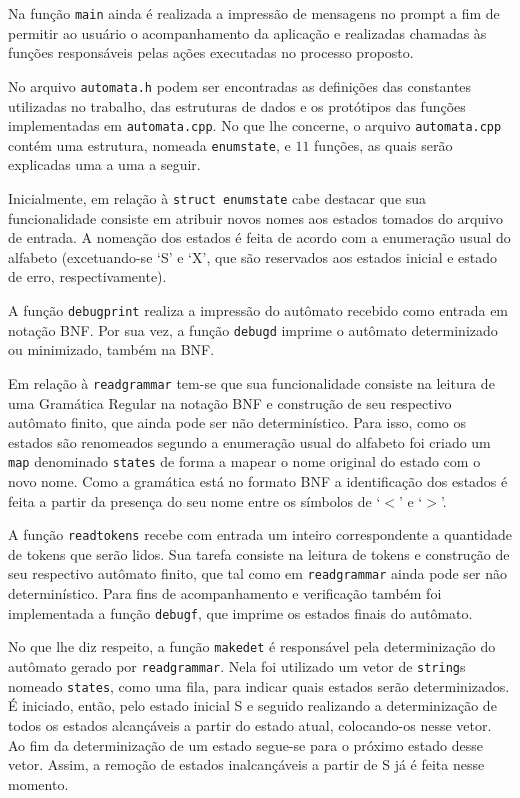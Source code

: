 \documentclass[12pt]{article}
\begin{document}
Na função \texttt{main} ainda é realizada a impressão de mensagens no prompt a fim de permitir ao usuário o acompanhamento da aplicação e realizadas chamadas às funções responsáveis pelas ações executadas no processo proposto.

No arquivo \texttt{automata.h} podem ser encontradas as definições das constantes utilizadas no trabalho, das estruturas de dados e os protótipos das funções implementadas em \texttt{automata.cpp}. No que lhe concerne, o arquivo \texttt{automata.cpp} contém uma estrutura, nomeada \texttt{enumstate}, e $11$ funções, as quais serão explicadas uma a uma a seguir.

Inicialmente, em relação à \texttt{struct enumstate} cabe destacar que sua funcionalidade consiste em atribuir novos nomes aos estados tomados do arquivo de entrada. A nomeação dos estados é feita de acordo com a enumeração usual do alfabeto (excetuando-se `S' e `X', que são reservados aos estados inicial e estado de erro, respectivamente).

A função \texttt{debugprint} realiza a impressão do autômato recebido como entrada em notação BNF. Por sua vez, a função \texttt{debugd} imprime o autômato determinizado ou minimizado, também na BNF.

Em relação à \texttt{readgrammar} tem-se que sua funcionalidade consiste na leitura de uma Gramática Regular na notação BNF e construção de seu respectivo autômato finito, que ainda pode ser não determinístico. Para isso, como os estados são renomeados segundo a enumeração usual do alfabeto foi criado um \texttt{map} denominado \texttt{states} de forma a mapear o nome original do estado com o novo nome. Como a gramática está no formato BNF a identificação dos estados é feita a partir da presença do seu nome entre os símbolos de `$<$' e `$>$'.

A função \texttt{readtokens} recebe com entrada um inteiro correspondente a quantidade de tokens que serão lidos. Sua tarefa consiste na leitura de tokens e construção de seu respectivo autômato finito, que tal como em \texttt{readgrammar} ainda pode ser não determinístico. Para fins de acompanhamento  e verificação também foi implementada a função \texttt{debugf}, que imprime os estados finais do autômato.

No que lhe diz respeito, a função \texttt{makedet} é responsável pela determinização do autômato gerado por \texttt{readgrammar}. Nela foi utilizado um vetor de \texttt{string}s nomeado \texttt{states}, como uma fila, para indicar quais estados serão determinizados. É iniciado, então, pelo estado inicial S e seguido realizando a determinização de todos os estados alcançáveis a partir do estado atual, colocando-os nesse vetor. Ao fim da determinização de um estado segue-se para o próximo estado desse vetor. Assim, a remoção de estados inalcançáveis a partir de S já é feita nesse momento.
\end{document}
